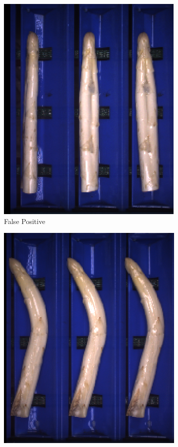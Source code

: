 \begin{figure}[h]
	\begin{subfigure}{0.3\textwidth}
		\includegraphics[width=0.9\linewidth]{Figures/appendix/verythick_falsepositive_01.png}
		\vspace{-5pt}
		\caption{False Positive}
	\end{subfigure}
	\begin{subfigure}{0.3\textwidth}
		\includegraphics[width=0.9\linewidth]{Figures/appendix/verythick_falsepositive_02.png}

\end{subfigure}
\end{figure}
